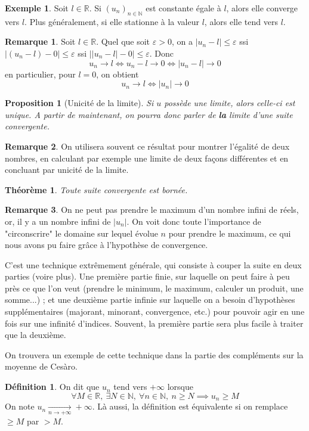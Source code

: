 \documentclass[french]{book}
\newcommand{\N}{\mathbb{N}}
\newcommand{\R}{\mathbb{R}}
\theoremstyle{plain}
\newtheorem{thm}{Théorème}[chapter]
\newtheorem{prop}{Proposition}[chapter]
\theoremstyle{definition}
\newtheorem{dfn}{Définition}[chapter]
\newtheorem{exa}{Exemple}[chapter]
\newtheorem{rmq}{Remarque}[chapter]
\theoremstyle{remark}
\begin{document}
\begin{exa}
	Soit $l\in\R$. Si $(u_n)_{n\in\N}$ est constante égale à $l$, alors elle converge vers $l$. Plus généralement, si elle stationne à la valeur $l$, alors elle tend vers $l$.
\end{exa}
\begin{rmq}
	Soit $l\in\R$. Quel que soit $\varepsilon>0$, on a $\lvert u_n-l\rvert\leqslant\varepsilon$ ssi $\lvert(u_n-l)-0\rvert\leqslant\varepsilon$ ssi $\left\lvert \lvert u_n-l\rvert -0\right\rvert\leqslant\varepsilon$. Donc $$u_n\rightarrow l\iff u_n-l\rightarrow 0 \iff \lvert u_n-l\rvert\rightarrow0$$ en particulier, pour $l=0$, on obtient $$u_n\rightarrow l\iff\lvert u_n\rvert \rightarrow0$$
\end{rmq}
\begin{prop}[Unicité de la limite]
	Si $u$ possède une limite, alors celle-ci est unique. A partir de maintenant, on pourra donc parler de \textbf{la} limite d'une suite convergente.
\end{prop}
\begin{rmq}
	On utilisera souvent ce résultat pour montrer l'égalité de deux nombres, en calculant par exemple une limite de deux façons différentes et en concluant par unicité de la limite.
\end{rmq}
\begin{thm}
	Toute suite convergente est bornée.
\end{thm}
\begin{rmq}
	On ne peut pas prendre le maximum d'un nombre infini de réels, or, il y a un nombre infini de $\lvert u_n\rvert$. On voit donc toute l'importance de "circonscrire" le domaine sur lequel évolue $n$ pour prendre le maximum, ce qui nous avons pu faire grâce à l'hypothèse de convergence. \par C'est une technique extrêmement générale, qui consiste à couper la suite en deux parties (voire plus). Une première partie finie, sur laquelle on peut faire à peu près ce que l'on veut (prendre le minimum, le maximum, calculer un produit, une somme...) ; et une deuxième partie infinie sur laquelle on a besoin d'hypothèses supplémentaires (majorant, minorant, convergence, etc.) pour pouvoir agir en une fois sur une infinité d'indices. Souvent, la première partie sera plus facile à traiter que la deuxième. \par On trouvera un exemple de cette technique dans la partie des compléments sur la moyenne de Cesàro.
\end{rmq}
\begin{dfn}
	On dit que $u_n$ tend vers $+\infty$ lorsque $$\forall M\in\R,\ \exists N\in\N,\ \forall n\in\N,\ n\geqslant N\implies u_n\geqslant M$$ On note $u_n\xrightarrow[n\to+\infty]{}+\infty$. Là aussi, la définition est équivalente si on remplace $\geqslant M$ par $>M$.
\end{dfn}
\end{document}
